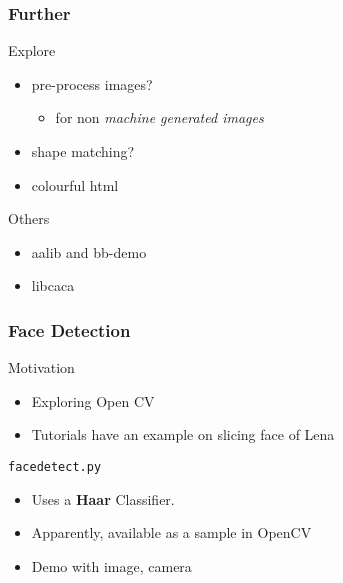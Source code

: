 \documentclass[presentation]{beamer}
\begin{document}
\begin{frame}
\frametitle{Further}
\label{sec-3_2}
\begin{block}{Explore}
\label{sec-3_2_1}
\begin{itemize}

\item pre-process images?
\label{sec-3_2_1_1}%
\begin{itemize}

\item for non \emph{machine generated images}\\
\label{sec-3_2_1_1_1}%
\end{itemize} %

\item shape matching?\\
\label{sec-3_2_1_2}%
\item colourful html\\
\label{sec-3_2_1_3}%
\end{itemize} %
\end{block}
\begin{block}{Others}
\label{sec-3_2_2}
\begin{itemize}

\item aalib and bb-demo\\
\label{sec-3_2_2_1}%
\item libcaca\\
\label{sec-3_2_2_2}%
\end{itemize} %
\end{block}
\end{frame}
\begin{frame}
\frametitle{Face Detection}
\label{sec-3_3}
\begin{block}{Motivation}
\label{sec-3_3_1}
\begin{itemize}

\item Exploring Open CV\\
\label{sec-3_3_1_1}%
\item Tutorials have an example on slicing face of Lena\\
\label{sec-3_3_1_2}%
\end{itemize} %
\end{block}
\begin{block}{\texttt{facedetect.py}}
\label{sec-3_3_2}
\begin{itemize}

\item Uses a \textbf{Haar} Classifier.\\
\label{sec-3_3_2_1}%
\item Apparently, available as a sample in OpenCV\\
\label{sec-3_3_2_2}%
\item Demo with image, camera\\
\label{sec-3_3_2_3}%
\end{itemize} %
\end{block}
\end{frame}
\end{document}
